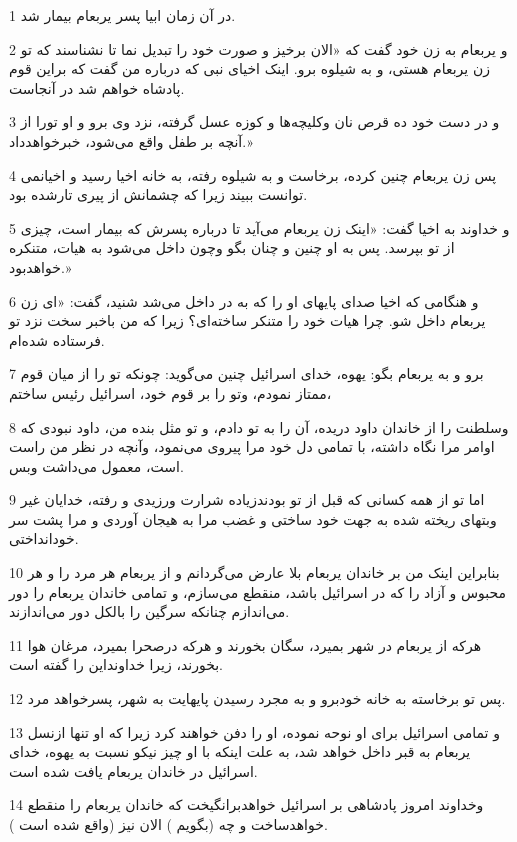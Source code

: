 \par 1 در آن زمان ابیا پسر یربعام بیمار شد.
\par 2 و یربعام به زن خود گفت که «الان برخیز و صورت خود را تبدیل نما تا نشناسند که تو زن یربعام هستی، و به شیلوه برو. اینک اخیای نبی که درباره من گفت که براین قوم پادشاه خواهم شد در آنجاست.
\par 3 و در دست خود ده قرص نان وکلیچه‌ها و کوزه عسل گرفته، نزد وی برو و او تورا از آنچه بر طفل واقع می‌شود، خبر‌خواهدداد.»
\par 4 پس زن یربعام چنین کرده، برخاست و به شیلوه رفته، به خانه اخیا رسید و اخیانمی توانست ببیند زیرا که چشمانش از پیری تارشده بود.
\par 5 و خداوند به اخیا گفت: «اینک زن یربعام می‌آید تا درباره پسرش که بیمار است، چیزی از تو بپرسد. پس به او چنین و چنان بگو وچون داخل می‌شود به هیات، متنکره خواهدبود.»
\par 6 و هنگامی که اخیا صدای پایهای او را که به در داخل می‌شد شنید، گفت: «ای زن یربعام داخل شو. چرا هیات خود را متنکر ساخته‌ای؟ زیرا که من باخبر سخت نزد تو فرستاده شده‌ام.
\par 7 برو و به یربعام بگو: یهوه، خدای اسرائیل چنین می‌گوید: چونکه تو را از میان قوم ممتاز نمودم، وتو را بر قوم خود، اسرائیل رئیس ساختم،
\par 8 وسلطنت را از خاندان داود دریده، آن را به تو دادم، و تو مثل بنده من، داود نبودی که اوامر مرا نگاه داشته، با تمامی دل خود مرا پیروی می‌نمود، وآنچه در نظر من راست است، معمول می‌داشت وبس.
\par 9 اما تو از همه کسانی که قبل از تو بودندزیاده شرارت ورزیدی و رفته، خدایان غیر وبتهای ریخته شده به جهت خود ساختی و غضب مرا به هیجان آوردی و مرا پشت سر خودانداختی.
\par 10 بنابراین اینک من بر خاندان یربعام بلا عارض می‌گردانم و از یربعام هر مرد را و هر محبوس و آزاد را که در اسرائیل باشد، منقطع می‌سازم، و تمامی خاندان یربعام را دور می‌اندازم چنانکه سرگین را بالکل دور می‌اندازند.
\par 11 هرکه از یربعام در شهر بمیرد، سگان بخورند و هرکه درصحرا بمیرد، مرغان هوا بخورند، زیرا خداونداین را گفته است.
\par 12 پس تو برخاسته به خانه خودبرو و به مجرد رسیدن پایهایت به شهر، پسرخواهد مرد.
\par 13 و تمامی اسرائیل برای او نوحه نموده، او را دفن خواهند کرد زیرا که او تنها ازنسل یربعام به قبر داخل خواهد شد، به علت اینکه با او چیز نیکو نسبت به یهوه، خدای اسرائیل در خاندان یربعام یافت شده است.
\par 14 وخداوند امروز پادشاهی بر اسرائیل خواهدبرانگیخت که خاندان یربعام را منقطع خواهدساخت و چه (بگویم ) الان نیز (واقع شده است ).
